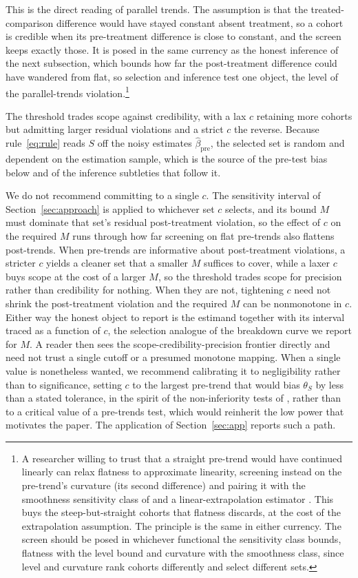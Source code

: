 \documentclass[12pt]{article}
\theoremstyle{remark}
\begin{document}
This is the direct reading of parallel trends. The assumption is that the treated-comparison difference
would have stayed constant absent treatment, so a cohort is credible when its pre-treatment difference
is close to constant, and the screen keeps exactly those. It is posed in the same currency as the honest
inference of the next subsection, which bounds how far the post-treatment difference could have wandered
from flat, so selection and inference test one object, the level of the parallel-trends
violation.\footnote{A researcher willing to trust that a straight pre-trend would have continued linearly
can relax flatness to approximate linearity, screening instead on the pre-trend's curvature (its second
difference) and pairing it with the smoothness sensitivity class of \citet{rambachan2023} and a
linear-extrapolation estimator \citep{armstrong2018}. This buys the steep-but-straight cohorts that
flatness discards, at the cost of the extrapolation assumption. The principle is the same in either
currency. The screen should be posed in whichever functional the sensitivity class bounds, flatness with
the level bound and curvature with the smoothness class, since level and curvature rank cohorts
differently and select different sets.}

The threshold trades scope
against credibility, with a lax $c$ retaining more cohorts but admitting larger residual violations and a
strict $c$ the reverse. Because rule~\eqref{eq:rule} reads $S$ off the noisy estimates $\hat\beta_{\mathrm{pre}}$, the selected set
is random and dependent on the estimation sample, which is the source of the pre-test bias below and of the
inference subtleties that follow it.

We do not recommend committing to a single $c$. The sensitivity interval of
Section~\ref{sec:approach} is applied to whichever set $c$ selects, and its bound $M$ must dominate that
set's residual post-treatment violation, so the effect of $c$ on the required $M$ runs through how
far screening on flat pre-trends also flattens post-trends. When pre-trends are informative about
post-treatment violations, a stricter $c$ yields a cleaner set that a smaller $M$ suffices to cover, while
a laxer $c$ buys scope at the cost of a larger $M$, so the threshold trades scope for precision rather than
credibility for nothing. When they are not, tightening $c$ need not shrink the post-treatment violation and
the required $M$ can be nonmonotone in $c$. Either way the honest object to report is the estimand together
with its interval traced as a function of $c$, the selection analogue of the breakdown curve we report for
$M$. A reader then sees the scope-credibility-precision frontier directly and need not trust a single
cutoff or a presumed monotone mapping. When a
single value is nonetheless wanted, we recommend calibrating it to negligibility rather than to
significance, setting $c$ to the largest pre-trend that would bias $\theta_S$ by less than a stated
tolerance, in the spirit of the non-inferiority tests of \citet{bilinski2020}, rather than to a critical
value of a pre-trends test, which would reinherit the low power that motivates the paper. The
application of Section~\ref{sec:app} reports such a path.
\end{document}
